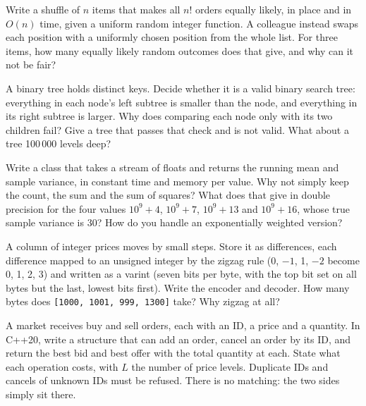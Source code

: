 \begin{question}\label{iq:iv3:algorithms:45}
Write a shuffle of $n$ items that makes all $n!$ orders equally likely, in place and in $O(n)$ time, given a uniform random integer function. A colleague instead swaps each position with a uniformly chosen position from the whole list. For three items, how many equally likely random outcomes does that give, and why can it not be fair?
\end{question}

\begin{question}\label{iq:iv3:algorithms:46}
A binary tree holds distinct keys. Decide whether it is a valid binary search tree: everything in each node's left subtree is smaller than the node, and everything in its right subtree is larger. Why does comparing each node only with its two children fail? Give a tree that passes that check and is not valid. What about a tree 100\,000 levels deep?
\end{question}

\begin{question}\label{iq:iv3:algorithms:47}
Write a class that takes a stream of floats and returns the running mean and sample variance, in constant time and memory per value. Why not simply keep the count, the sum and the sum of squares? What does that give in double precision for the four values $10^9 + 4$, $10^9 + 7$, $10^9 + 13$ and $10^9 + 16$, whose true sample variance is 30? How do you handle an exponentially weighted version?
\end{question}

\begin{question}\label{iq:iv3:algorithms:48}
A column of integer prices moves by small steps. Store it as differences, each difference mapped to an unsigned integer by the zigzag rule (0, $-1$, 1, $-2$ become 0, 1, 2, 3) and written as a varint (seven bits per byte, with the top bit set on all bytes but the last, lowest bits first). Write the encoder and decoder. How many bytes does \texttt{[1000, 1001, 999, 1300]} take? Why zigzag at all?
\end{question}

\begin{question}\label{iq:iv3:algorithms:49}
A market receives buy and sell orders, each with an ID, a price and a quantity. In C++20, write a structure that can add an order, cancel an order by its ID, and return the best bid and best offer with the total quantity at each. State what each operation costs, with $L$ the number of price levels. Duplicate IDs and cancels of unknown IDs must be refused. There is no matching: the two sides simply sit there.
\end{question}

